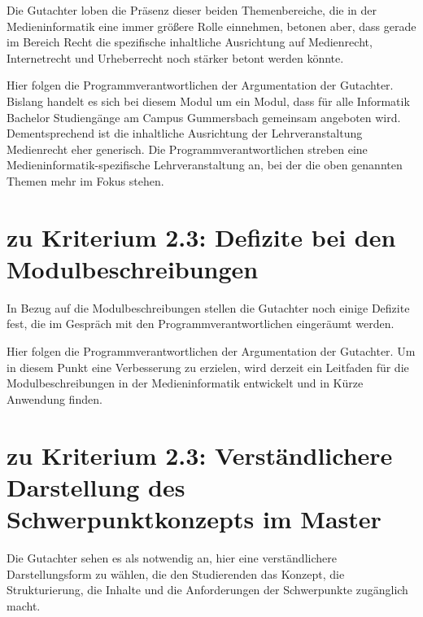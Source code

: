 \begin{siderules}
Die Gutachter loben die Präsenz dieser beiden Themenbereiche, die in der
Medieninformatik eine immer größere Rolle einnehmen, betonen aber, dass
gerade im Bereich Recht die spezifische inhaltliche Ausrichtung auf
Medienrecht, Internetrecht und Urheberrecht noch stärker betont werden
könnte.
\end{siderules}

Hier folgen die Programmverantwortlichen der Argumentation der
Gutachter. Bislang handelt es sich bei diesem Modul um ein Modul, dass
für alle Informatik Bachelor Studiengänge am Campus Gummersbach
gemeinsam angeboten wird. Dementsprechend ist die inhaltliche
Ausrichtung der Lehrveranstaltung Medienrecht eher generisch. Die
Programmverantwortlichen streben eine Medieninformatik-spezifische
Lehrveranstaltung an, bei der die oben genannten Themen mehr im Fokus
stehen.

\section{zu Kriterium 2.3: Defizite bei den
Modulbeschreibungen}\label{zu-kriterium-2.3-defizite-bei-den-modulbeschreibungen}

\begin{siderules}
In Bezug auf die Modulbeschreibungen stellen die Gutachter noch einige
Defizite fest, die im Gespräch mit den Programmverantwortlichen
eingeräumt werden.
\end{siderules}

Hier folgen die Programmverantwortlichen der Argumentation der
Gutachter. Um in diesem Punkt eine Verbesserung zu erzielen, wird
derzeit ein Leitfaden für die Modulbeschreibungen in der
Medieninformatik entwickelt und in Kürze Anwendung finden.

\section{zu Kriterium 2.3: Verständlichere Darstellung des
Schwerpunktkonzepts im
Master}\label{zu-kriterium-2.3-verstuxe4ndlichere-darstellung-des-schwerpunktkonzepts-im-master}

\begin{siderules}
Die Gutachter sehen es als notwendig an, hier eine verständlichere
Darstellungsform zu wählen, die den Studierenden das Konzept, die
Strukturierung, die Inhalte und die Anforderungen der Schwerpunkte
zugänglich macht.
\end{siderules}

